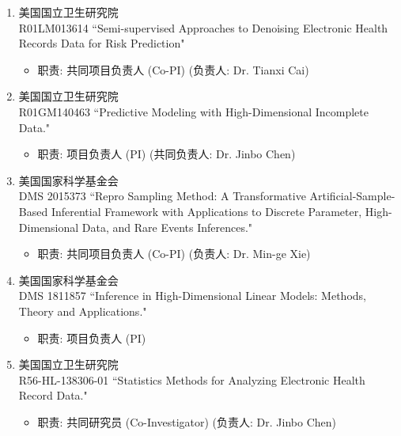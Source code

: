 \documentclass[margin, line]{res}
\begin{document}
\begin{resume}
\begin{enumerate}
            \item 美国国立卫生研究院\\ R01LM013614 ``Semi-supervised
                Approaches to Denoising Electronic Health Records Data for Risk
                Prediction"
                \begin{itemize}
                    \item[-] {职责: 共同项目负责人 (Co-PI)} (负责人: Dr. Tianxi Cai)
                \end{itemize}

            \item 美国国立卫生研究院\\ R01GM140463 ``Predictive Modeling
                with High-Dimensional Incomplete Data."
                \begin{itemize}
                    \item[-] {职责: 项目负责人 (PI)} (共同负责人: Dr. Jinbo Chen)
                \end{itemize}

            \item 美国国家科学基金会\\ DMS 2015373 ``Repro Sampling Method: A
                Transformative Artificial-Sample-Based Inferential Framework with Applications
                to Discrete Parameter, High-Dimensional Data, and Rare Events Inferences."
                \begin{itemize}
                    \item[-] {职责: 共同项目负责人 (Co-PI)} (负责人: Dr. Min-ge Xie)
                \end{itemize}

            \item 美国国家科学基金会\\ DMS 1811857 ``Inference in High-Dimensional
                Linear Models: Methods, Theory and Applications."
                \begin{itemize}
                    \item[-] {职责: 项目负责人 (PI)}
                \end{itemize}

            \item 美国国立卫生研究院\\ R56-HL-138306-01 ``Statistics Methods
                for Analyzing Electronic Health Record Data."
                \begin{itemize}
                    \item[-] {职责: 共同研究员 (Co-Investigator)} (负责人: Dr. Jinbo Chen)
                \end{itemize}


\end{enumerate}
\end{resume}
\end{document}
